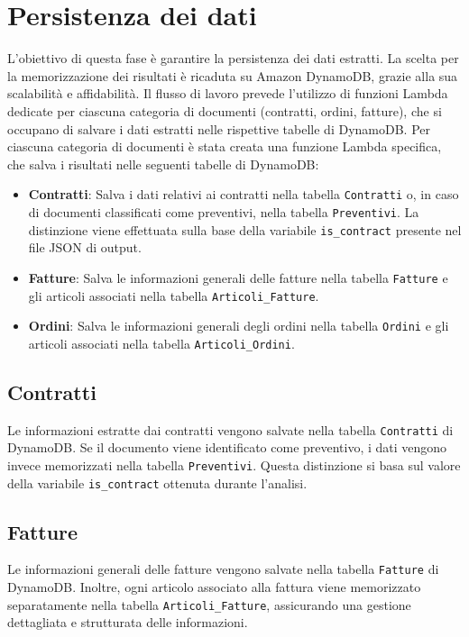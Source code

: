 \section{Persistenza dei dati}
L'obiettivo di questa fase è garantire la persistenza dei dati estratti. La scelta per la memorizzazione dei risultati è ricaduta su Amazon DynamoDB, grazie alla sua scalabilità e affidabilità. Il flusso di lavoro prevede l'utilizzo di funzioni Lambda dedicate per ciascuna categoria di documenti (contratti, ordini, fatture), che si occupano di salvare i dati estratti nelle rispettive tabelle di DynamoDB.
Per ciascuna categoria di documenti è stata creata una funzione Lambda specifica, che salva i risultati nelle seguenti tabelle di DynamoDB:
\begin{itemize}
    \item \textbf{Contratti}: Salva i dati relativi ai contratti nella tabella \texttt{Contratti} o, in caso di documenti classificati come preventivi, nella tabella \texttt{Preventivi}. La distinzione viene effettuata sulla base della variabile \texttt{is\_contract} presente nel file JSON di output.
    \item \textbf{Fatture}: Salva le informazioni generali delle fatture nella tabella \texttt{Fatture} e gli articoli associati nella tabella \texttt{Articoli\_Fatture}.
    \item \textbf{Ordini}: Salva le informazioni generali degli ordini nella tabella \texttt{Ordini} e gli articoli associati nella tabella \texttt{Articoli\_Ordini}.
\end{itemize}

\subsection{Contratti}
Le informazioni estratte dai contratti vengono salvate nella tabella \texttt{Contratti} di DynamoDB. Se il documento viene identificato come preventivo, i dati vengono invece memorizzati nella tabella \texttt{Preventivi}. Questa distinzione si basa sul valore della variabile \texttt{is\_contract} ottenuta durante l'analisi.

\subsection{Fatture}
Le informazioni generali delle fatture vengono salvate nella tabella \texttt{Fatture} di DynamoDB. Inoltre, ogni articolo associato alla fattura viene memorizzato separatamente nella tabella \texttt{Articoli\_Fatture}, assicurando una gestione dettagliata e strutturata delle informazioni.

